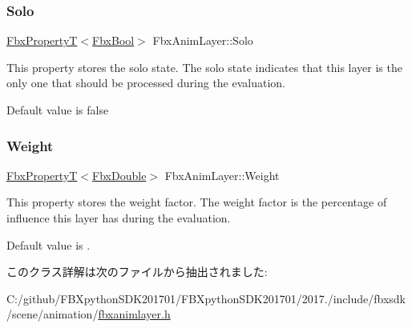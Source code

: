 \subsubsection{\texorpdfstring{Solo}{Solo}}
{\footnotesize\ttfamily \hyperlink{class_fbx_property_t}{Fbx\+PropertyT}$<$\hyperlink{fbxtypes_8h_a92e0562b2fe33e76a242f498b362262e}{Fbx\+Bool}$>$ Fbx\+Anim\+Layer\+::\+Solo}

This property stores the solo state. The solo state indicates that this layer is the only one that should be processed during the evaluation.

Default value is {\ttfamily false} \mbox{\label{class_fbx_anim_layer_a6ab882a24bdf15c3448d064955bf0535}} 
\subsubsection{\texorpdfstring{Weight}{Weight}}
{\footnotesize\ttfamily \hyperlink{class_fbx_property_t}{Fbx\+PropertyT}$<$\hyperlink{fbxtypes_8h_a171e72a1c46fc15c1a6c9c31948c1c5b}{Fbx\+Double}$>$ Fbx\+Anim\+Layer\+::\+Weight}

This property stores the weight factor. The weight factor is the percentage of influence this layer has during the evaluation.

Default value is {.} 

このクラス詳解は次のファイルから抽出されました\+:\begin{DoxyCompactItemize}
\item 
C\+:/github/\+F\+B\+Xpython\+S\+D\+K201701/\+F\+B\+Xpython\+S\+D\+K201701/2017./include/fbxsdk/scene/animation/\hyperlink{fbxanimlayer_8h}{fbxanimlayer.\+h}\end{DoxyCompactItemize}
